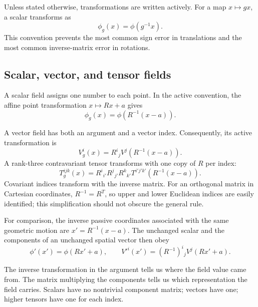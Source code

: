 \documentclass[11pt]{article}
\begin{document}
\begin{remarkbox}
Unless stated otherwise, transformations are written actively.  For a map
$x\mapsto g x$, a scalar transforms as
\begin{equation*}
  \phi_g(x)=\phi(g^{-1}x).
\end{equation*}
This convention prevents the most common sign error in translations and the
most common inverse-matrix error in rotations.
\end{remarkbox}

\subsection{Scalar, vector, and tensor fields}

A scalar field assigns one number to each point.  In the active convention,
the affine point transformation $x\mapsto Rx+a$ gives
\begin{equation}
  \phi_g(x)=\phi\!\left(R^{-1}(x-a)\right).
  \label{eq:activescalar}
\end{equation}

A vector field has both an argument and a vector index.  Consequently, its
active transformation is
\begin{equation}
  V_g^i(x)=R^i{}_j
  V^j\!\left(R^{-1}(x-a)\right).
  \label{eq:vectoractive}
\end{equation}
A rank-three contravariant tensor transforms with one copy of $R$ per index:
\begin{equation}
  T_g^{ijk}(x)
  =R^i{}_{i'}R^j{}_{j'}R^k{}_{k'}
  T^{i'j'k'}\!\left(R^{-1}(x-a)\right).
  \label{eq:tensortransform}
\end{equation}
Covariant indices transform with the inverse matrix.  For an orthogonal
matrix in Cartesian coordinates, $R^{-1}=R^T$, so upper and lower Euclidean
indices are easily identified; this simplification should not obscure the
general rule.

For comparison, the inverse passive coordinates associated with the same
geometric motion are $x'=R^{-1}(x-a)$.  The unchanged scalar and the
components of an unchanged spatial vector then obey
\begin{equation}
  \phi'(x')=\phi(Rx'+a),
  \qquad
  V'^i(x')=(R^{-1})^i{}_jV^j(Rx'+a).
  \label{eq:passivefields}
\end{equation}

\begin{keyidea}
The inverse transformation in the argument tells us where the field value
came from.  The matrix multiplying the components tells us which
representation the field carries.  Scalars have no nontrivial component
matrix; vectors have one; higher tensors have one for each index.
\end{keyidea}
\end{document}
